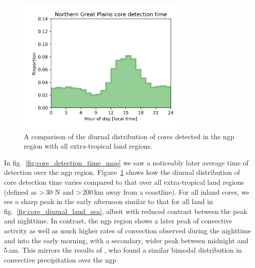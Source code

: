 \begin{figure}[tp]
    \centering
    \includegraphics[width=0.75\textwidth]{figures/chapter2_13.png}
    \caption[
    A comparison of the diurnal distribution of cores detected in the \acrshort{ngp} region with all extra-tropical land regions
    ]{
    A comparison of the diurnal distribution of cores detected in the \acrshort{ngp} region with all extra-tropical land regions.
    }
    \label{fig:core_ngp_contrast}
\end{figure}

In fig.~\ref{fig:core_detection_time_map} we saw a noticeably later average time of detection over the \acrfull{ngp} region.
Figure~\ref{fig:core_ngp_contrast} shows how the diurnal distribution of core detection time varies compared to that over all extra-tropical land regions (defined as \textgreater\,30\,\textdegree\,N and \textgreater\,200\,\unit{km} away from a coastline).
For all inland cores, we see a sharp peak in the early afternoon similar to that for all land in fig.~\ref{fig:core_diurnal_land_sea}, albeit with reduced contrast between the peak and nighttime.
In contrast, the \acrshort{ngp} region shows a later peak of convective activity as well as much higher rates of convection observed during the nighttime and into the early morning, with a secondary, wider peak between midnight and 5\,am.
This mirrors the results of \citet{li_high-resolution_2021}, who found a similar bimodal distribution in convective precipitation over the \acrshort{ngp}



